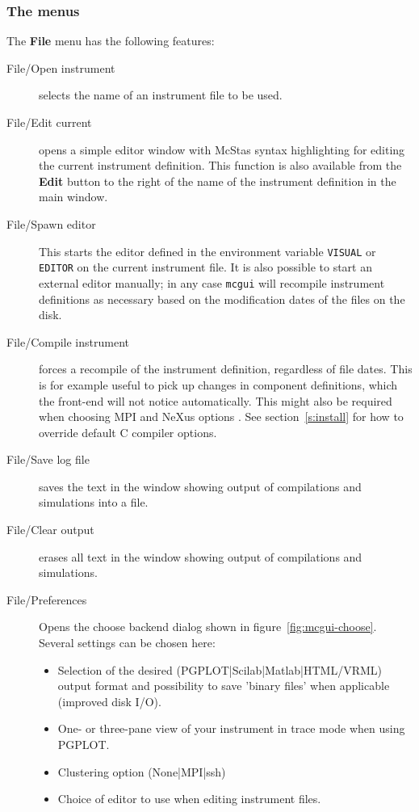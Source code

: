 \subsubsection{The menus}

The {\bf File} menu has the following features:
\begin{description}
\item[File/Open instrument] selects the name of an instrument file to be used.
\item[File/Edit current] opens a simple editor window with McStas syntax
  highlighting for editing the
  current instrument definition. This function is also available from
  the {\bf Edit} button to the right of the name of the instrument definition in
  the main window.
\item[File/Spawn editor] This starts the editor defined in the environment
  variable \verb+VISUAL+ or \verb+EDITOR+ on the current instrument
  file. It is also possible to start an external editor manually; in any
  case \verb+mcgui+ will recompile instrument definitions as necessary based on
  the modification dates of the files on the disk.
\item[File/Compile instrument] forces a recompile of the instrument
  definition, regardless of file dates. This is for example useful to
  pick up changes in component definitions, which the front-end will not
  notice automatically. This might also be required when choosing MPI  and NeXus options . See section~\ref{s:install} for how to override
  default C compiler options.
\item[File/Save log file] saves the text in the window showing output of
  compilations and simulations into a file.
\item[File/Clear output] erases all text in the window showing output of
  compilations and simulations.
  \item[File/Preferences] Opens the choose backend dialog shown in
  figure~\ref{fig:mcgui-choose}. Several settings can be chosen here:
\begin{itemize}
  \item Selection of  the desired (PGPLOT|Scilab|Matlab|HTML/VRML) output
    format and possibility to save 'binary files' when
  applicable (improved disk I/O).
  \item One- or three-pane view of your instrument in trace mode when
    using PGPLOT.
  \item Clustering option (None|MPI|ssh)
  \item Choice of editor to use when editing instrument files.

\end{itemize}
\end{description}
